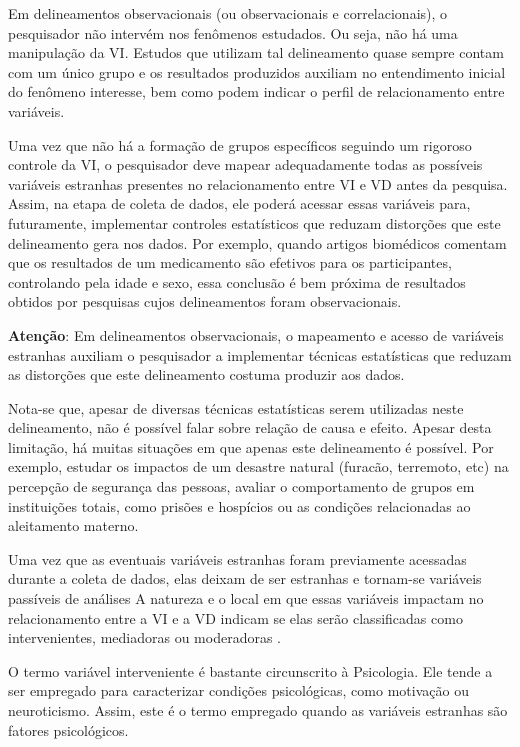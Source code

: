 \documentclass[
]{book}
\newenvironment{warning}{
  \definecolor{shadecolor}{rgb}{0, 0, 0}  %
  \color{white}
  \begin{shaded}}
 {\end{shaded}}
\begin{document}
Em delineamentos observacionais (ou observacionais e correlacionais), o pesquisador não intervém nos fenômenos estudados. Ou seja, não há uma manipulação da VI. Estudos que utilizam tal delineamento quase sempre contam com um único grupo e os resultados produzidos auxiliam no entendimento inicial do fenômeno interesse, bem como podem indicar o perfil de relacionamento entre variáveis.

Uma vez que não há a formação de grupos específicos seguindo um rigoroso controle da VI, o pesquisador deve mapear adequadamente todas as possíveis variáveis estranhas presentes no relacionamento entre VI e VD antes da pesquisa. Assim, na etapa de coleta de dados, ele poderá acessar essas variáveis para, futuramente, implementar controles estatísticos que reduzam distorções que este delineamento gera nos dados. Por exemplo, quando artigos biomédicos comentam que os resultados de um medicamento são efetivos para os participantes, controlando pela idade e sexo, essa conclusão é bem próxima de resultados obtidos por pesquisas cujos delineamentos foram observacionais.

\begin{warning}

\textbf{Atenção}: Em delineamentos observacionais, o mapeamento e acesso de variáveis estranhas auxiliam o pesquisador a implementar técnicas estatísticas que reduzam as distorções que este delineamento costuma produzir aos dados.

\end{warning}

Nota-se que, apesar de diversas técnicas estatísticas serem utilizadas neste delineamento, não é possível falar sobre relação de causa e efeito. Apesar desta limitação, há muitas situações em que apenas este delineamento é possível. Por exemplo, estudar os impactos de um desastre natural (furacão, terremoto, etc) na percepção de segurança das pessoas, avaliar o comportamento de grupos em instituições totais, como prisões e hospícios ou as condições relacionadas ao aleitamento materno.

Uma vez que as eventuais variáveis estranhas foram previamente acessadas durante a coleta de dados, elas deixam de ser estranhas e tornam-se variáveis passíveis de análises A natureza e o local em que essas variáveis impactam no relacionamento entre a VI e a VD indicam se elas serão classificadas como intervenientes, mediadoras ou moderadoras \citep{Rooney2019, hayes2013}.

O termo variável interveniente é bastante circunscrito à Psicologia. Ele tende a ser empregado para caracterizar condições psicológicas, como motivação ou neuroticismo. Assim, este é o termo empregado quando as variáveis estranhas são fatores psicológicos.
\end{document}

